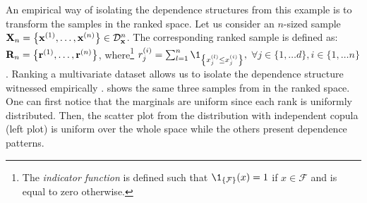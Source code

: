 An empirical way of isolating the dependence structures from this example is to transform the samples in the ranked space. 
Let us consider an $n$-sized sample ${\bf X}_n = \left\{{\bf x}^{(1)}, \dots, {\bf x}^{(n)}\right\} \in \mathcal{D}_{{\bf x}}^{n}$. 
The corresponding ranked sample is defined as: ${\bf R}_n = \left\{{\bf r}^{(1)}, \dots, {\bf r}^{(n)}\right\}$, 
where\footnote{The \textit{indicator function} is defined such that $\1_{\left\{\mathcal{F}\right\}}(x) = 1$ if $x \in \mathcal{F}$ and is equal to zero otherwise.} 
$r^{(i)}_j = \sum_{l=1}^n \1_{\left\{x^{(l)}_j \leq x^{(i)}_j\right\}},$ $\forall j \in \{1, \dots d\}, i \in \{1, \dots n\}$. 
Ranking a multivariate dataset allows us to isolate the dependence structure witnessed empirically \citep{saporta_2006}. 
 shows the same three samples from  in the ranked space. 
One can first notice that the marginals are uniform since each rank is uniformly distributed. 
Then, the scatter plot from the distribution with independent copula (left plot) is uniform over the whole space while the others present dependence patterns. 
